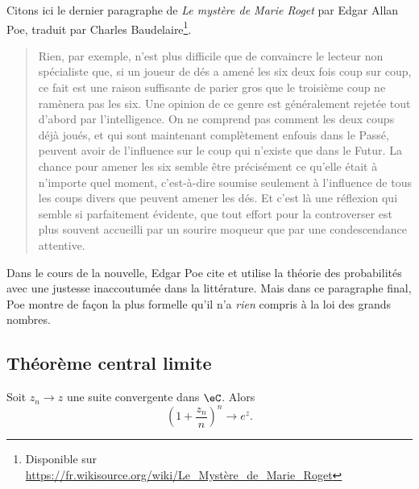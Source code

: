 \begin{example}
    Citons ici le dernier paragraphe de \emph{Le mystère de Marie Roget} par Edgar Allan Poe, traduit par Charles Baudelaire\footnote{Disponible sur \url{https://fr.wikisource.org/wiki/Le_Mystère_de_Marie_Roget}}.

    \begin{quote}
Rien, par exemple, n’est plus difficile que de convaincre le lecteur non spécialiste que, si un joueur de dés a amené les six deux fois coup sur coup, ce fait est une raison suffisante de parier gros que le troisième coup ne ramènera pas les six. Une opinion de ce genre est généralement rejetée tout d’abord par l’intelligence. On ne comprend pas comment les deux coups déjà joués, et qui sont maintenant complètement enfouis dans le Passé, peuvent avoir de l’influence sur le coup qui n’existe que dans le Futur. La chance pour amener les six semble être précisément ce qu’elle était à n’importe quel moment, c’est-à-dire soumise seulement à l’influence de tous les coups divers que peuvent amener les dés. Et c’est là une réflexion qui semble si parfaitement évidente, que tout effort pour la controverser est plus souvent accueilli par un sourire moqueur que par une condescendance attentive. 
    \end{quote}
    Dans le cours de la nouvelle, Edgar Poe cite et utilise la théorie des probabilités avec une justesse inaccoutumée dans la littérature. Mais dans ce paragraphe final, Poe montre de façon la plus formelle qu'il n'a \emph{rien} compris à la loi des grands nombres.
\end{example}

\subsection{Théorème central limite}

\begin{lemma}       \label{Lemexpznznsurnton}
    Soit \( z_n\to z\) une suite convergente dans \( \eC\). Alors
    \begin{equation}
        \left( 1+\frac{ z_n }{ n } \right)^n\to e^z.
    \end{equation}
\end{lemma}

